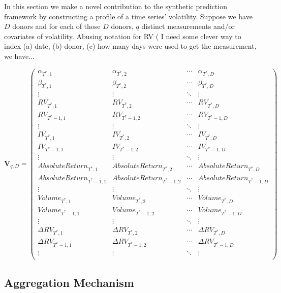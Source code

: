 \documentclass[11pt]{article}
\theoremstyle{definition}
\begin{document}
In this section we make a novel contribution to the synthetic prediction framework by constructing a profile of a time series' volatility.  Suppose we have $D$ donors and for each of those $D$ donors, $q$ distinct measurements and/or covariates of volatility.  Abusing notation for RV ( I need some clever way to index (a) date, (b) donor, (c) how many days were used to get the measurement, we have...

\begin{equation*}
\textbf{V}_{q,D} = 
\begin{pmatrix}
\alpha_{T^{*},1} & \alpha_{T^{*},2}  & \cdots & \alpha_{T^{*},D}  \\
\beta_{T^{*},1} & \beta_{T^{*},2}  & \cdots & \beta_{T^{*},D}  \\
\vdots  & \vdots  & \ddots & \vdots  \\
RV_{T^{*},1} & RV_{T^{*},2}  & \cdots & RV_{T^{*},D}  \\
RV_{T^{*}-1,1}  & RV_{T^{*}-1,2}  & \cdots & RV_{T^{*}-1,D}  \\
\vdots  & \vdots  & \ddots & \vdots  \\
IV_{T^{*},1} & IV_{T^{*},2} & \cdots & IV_{T^{*},D} \\
IV_{T^{*}-1,1}  & IV_{T^{*}-1,2}  & \cdots & IV_{T^{*}-1,D} \\
\vdots  & \vdots  & \ddots & \vdots  \\
AbsoluteReturn_{T^{*},1} & AbsoluteReturn_{T^{*},2} & \cdots & AbsoluteReturn_{T^{*},D} \\
AbsoluteReturn_{T^{*}-1,1}  & AbsoluteReturn_{T^{*}-1,2}  & \cdots & AbsoluteReturn_{T^{*}-1,D} \\
\vdots  & \vdots  & \ddots & \vdots  \\
Volume_{T^{*},1}  & Volume_{T^{*},2}  & \cdots & Volume_{T^{*},D} \\
Volume_{T^{*}-1,1}  & Volume_{T^{*}-1,2}  & \cdots & Volume_{T^{*}-1,D}  \\
\vdots  & \vdots  & \ddots & \vdots  \\
\Delta RV_{T^{*},1} & \Delta RV_{T^{*},2}  & \cdots & \Delta RV_{T^{*},D}  \\
\Delta RV_{T^{*}-1,1}  & \Delta RV_{T^{*}-1,2}  & \cdots & \Delta RV_{T^{*}-1,D}  \\
\vdots  & \vdots  & \ddots & \vdots  \\
\end{pmatrix}
\end{equation*}

\subsection{Aggregation Mechanism}
\label{Aggregation Mechanism}
\end{document}

